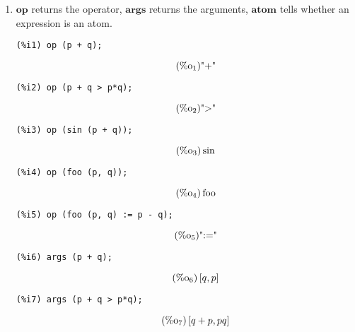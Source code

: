 \documentclass[12pt,leqno]{article}
\begin{document}
\begin{enumerate}
\item $\mathbf{op}$ returns the operator, $\mathbf{args}$ returns the arguments,
$\mathbf{atom}$ tells whether an expression is an atom.
\begin{verbatim}
(%i1) op (p + q);
\end{verbatim}
\begin{equation}
\tag{$\mathop{\mathrm{\%o}}_{1}$}\mbox{"+"}
\label{eq:doc-group1-code10-1-1}
\end{equation}
\begin{verbatim}
(%i2) op (p + q > p*q);
\end{verbatim}
\begin{equation}
\tag{$\mathop{\mathrm{\%o}}_{2}$}\mbox{">"}
\label{eq:doc-group1-code10-2-1}
\end{equation}
\begin{verbatim}
(%i3) op (sin (p + q));
\end{verbatim}
\begin{equation}
\tag{$\mathop{\mathrm{\%o}}_{3}$}\sin
\label{eq:doc-group1-code10-3-1}
\end{equation}
\begin{verbatim}
(%i4) op (foo (p, q));
\end{verbatim}
\begin{equation}
\tag{$\mathop{\mathrm{\%o}}_{4}$}\mathop{\mathrm{foo}}
\label{eq:doc-group1-code10-4-1}
\end{equation}
\begin{verbatim}
(%i5) op (foo (p, q) := p - q);
\end{verbatim}
\begin{equation}
\tag{$\mathop{\mathrm{\%o}}_{5}$}\mbox{":="}
\label{eq:doc-group1-code10-5-1}
\end{equation}
\begin{verbatim}
(%i6) args (p + q);
\end{verbatim}
\begin{equation}
\tag{$\mathop{\mathrm{\%o}}_{6}$}\left[q, p\right]
\label{eq:doc-group1-code10-6-1}
\end{equation}
\begin{verbatim}
(%i7) args (p + q > p*q);
\end{verbatim}
\begin{equation}
\tag{$\mathop{\mathrm{\%o}}_{7}$}\left[q+p, p q\right]
\label{eq:doc-group1-code10-7-1}
\end{equation}

\end{enumerate}
\end{document}
